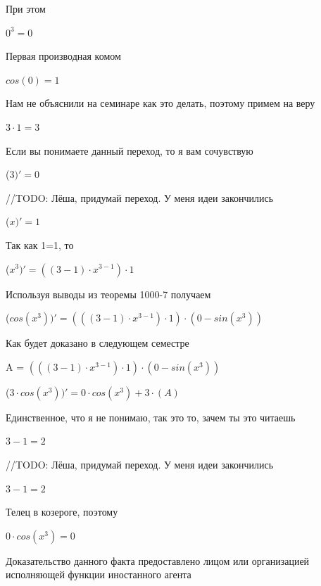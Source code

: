 \documentclass[12pt,a4paper,fleqn]{article}
\begin{document}
При этом

\begin{center}$0^{3} = 0$\end{center}
Первая производная комом\cite{link2}

\begin{center}$cos(0) = 1$\end{center}
Нам не объяснили на семинаре как это делать, поэтому примем на веру

\begin{center}$3 \cdot 1 = 3$\end{center}
Если вы понимаете данный переход, то я вам сочувствую

\begin{center}
 ($3)'
  = 0$\end{center}
//TODO: Лёша, придумай переход. У меня идеи закончились

\begin{center}
 ($x)'
  = 1$\end{center}
Так как 1=1, то\cite{link4}

\begin{center}
 ($x^{3})'
  = ((3-1) \cdot x^{3-1}) \cdot 1$\end{center}
Используя выводы из теоремы 1000-7 получаем

\begin{center}
 ($cos(x^{3}))'
  = (((3-1) \cdot x^{3-1}) \cdot 1) \cdot (0-sin(x^{3}))$\end{center}
Как будет доказано в следующем семестре

\begin{center}
A = $(((3-1) \cdot x^{3-1}) \cdot 1) \cdot (0-sin(x^{3}))$\end{center}
\begin{center}
 ($3 \cdot cos(x^{3}))'
  = 0 \cdot cos(x^{3})+3 \cdot (A)$\end{center}
Единственное, что я не понимаю, так это то, зачем ты это читаешь

\begin{center}$3-1 = 2$\end{center}
//TODO: Лёша, придумай переход. У меня идеи закончились

\begin{center}$3-1 = 2$\end{center}
Телец в козероге, поэтому

\begin{center}
$0 \cdot cos(x^{3}) = 0$\end{center}
Доказательство данного факта предоставлено лицом или организацией исполняющей функции иностанного агента
\end{document}
